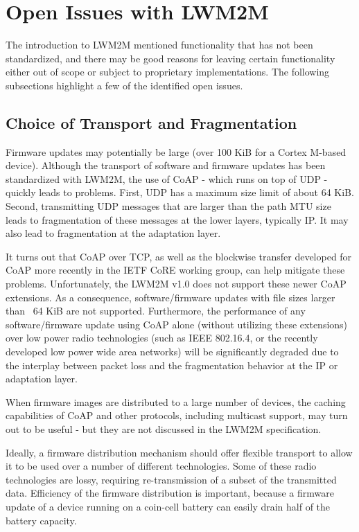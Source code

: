 \documentclass[peerreview, a4paper, 7pt]{IEEEtran}
\begin{document}
\section{Open Issues with LWM2M}
\label{open-issues}
The introduction to LWM2M mentioned functionality that has not been standardized, and there may be good reasons for leaving certain functionality either out of scope or subject to proprietary implementations. The following subsections highlight a few of the identified open issues. 

\subsection{Choice of Transport and Fragmentation}

Firmware updates may potentially be large (over 100 KiB for a Cortex M-based device). Although the transport of software and firmware updates has been standardized with LWM2M, the use of CoAP - which runs on top of UDP - quickly leads to problems. First, UDP has a maximum size limit of about 64 KiB. Second, transmitting UDP messages that are larger than the path MTU size leads to fragmentation of these messages at the lower layers, typically IP. It may also lead to fragmentation at the adaptation layer. 

It turns out that CoAP over TCP, as well as the blockwise transfer developed for CoAP more recently in the IETF CoRE working group, can help mitigate these problems. Unfortunately, the LWM2M v1.0 does not support these newer CoAP extensions. As a consequence, software/firmware updates with file sizes larger than ~64 KiB are not supported. Furthermore, the performance of any software/firmware update using CoAP alone (without utilizing these extensions) over low power radio technologies (such as IEEE 802.16.4, or the recently developed low power wide area networks) will be significantly degraded due to the interplay between packet loss and the fragmentation behavior at the IP or adaptation layer.

When firmware images are distributed to a large number of devices, the caching capabilities of CoAP and other protocols, including multicast support, may turn out to be useful - but they are not discussed in the LWM2M specification.

Ideally, a firmware distribution mechanism should offer flexible transport to allow it to be used over a number of different technologies. Some of these radio technologies are lossy, requiring re-transmission of a subset of the transmitted data. Efficiency of the firmware distribution is important, because a firmware update of a device running on a coin-cell battery can easily drain half of the battery capacity. 
\end{document}
